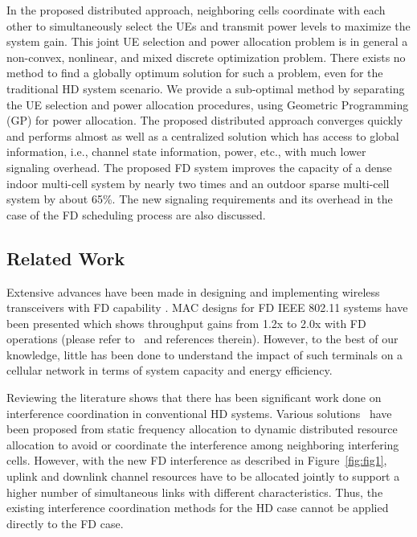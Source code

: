 \documentclass[journal]{IEEEtran}
\begin{document}
In the proposed distributed approach, neighboring cells coordinate with each other to simultaneously select the UEs and transmit power levels to maximize the system gain. This joint UE selection and power allocation problem is in general a non-convex, nonlinear, and mixed discrete optimization problem. There exists no method to find a globally optimum solution for such a problem, even for the traditional HD system scenario. We provide a sub-optimal method by separating the UE selection and power allocation procedures, using Geometric Programming (GP) for power allocation. The proposed distributed approach converges quickly and performs almost as well as a centralized solution which has access to global information, i.e., channel state information, power, etc., with much lower signaling overhead. The proposed FD system improves the capacity of a dense indoor multi-cell system by nearly two times and an outdoor sparse multi-cell system by about 65\%. The new signaling requirements and its overhead in the case of the FD scheduling process are also discussed. 

\subsection{Related Work} 
Extensive advances have been made in designing and implementing wireless transceivers with FD capability \cite{survey_JSAC,survey_kim}. MAC designs for FD IEEE 802.11 systems have been presented which shows throughput gains from 1.2x to 2.0x with FD operations (please refer to~\cite{survey_WLAN} and references therein). However, to the best of our knowledge, little has been done to understand the impact of such terminals on a cellular network in terms of system capacity and energy efficiency. 

Reviewing the literature shows that there has been significant work done on interference coordination in conventional HD systems. Various solutions~\cite{survey_IC_downlink} have been proposed from static frequency allocation to dynamic distributed resource allocation to avoid or coordinate the interference among neighboring interfering cells. However, with the new FD interference as described in Figure~\ref{fig:fig1}, uplink and downlink channel resources have to be allocated jointly to support a higher number of simultaneous links with different characteristics. Thus, the existing interference coordination methods for the HD case cannot be applied directly to the FD case. 
\end{document}
